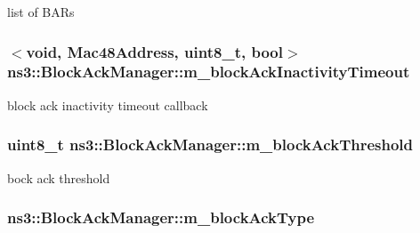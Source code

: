 list of B\+A\+Rs 

\subsubsection[{\texorpdfstring{m\+\_\+block\+Ack\+Inactivity\+Timeout}{m_blockAckInactivityTimeout}}]{$<$void, {\bf Mac48\+Address}, uint8\+\_\+t, bool$>$ ns3\+::\+Block\+Ack\+Manager\+::m\+\_\+block\+Ack\+Inactivity\+Timeout\hspace{0.3cm}{\ttfamily [private]}}\hypertarget{classns3_1_1BlockAckManager_aca48203aee618ed997d26c5e77a246a7}{}\label{classns3_1_1BlockAckManager_aca48203aee618ed997d26c5e77a246a7}


block ack inactivity timeout callback 

\subsubsection[{\texorpdfstring{m\+\_\+block\+Ack\+Threshold}{m_blockAckThreshold}}]{\setlength{\rightskip}{0pt plus 5cm}uint8\+\_\+t ns3\+::\+Block\+Ack\+Manager\+::m\+\_\+block\+Ack\+Threshold\hspace{0.3cm}{\ttfamily [private]}}\hypertarget{classns3_1_1BlockAckManager_a310943df91ddcf02959cd646a3b9cbce}{}\label{classns3_1_1BlockAckManager_a310943df91ddcf02959cd646a3b9cbce}


bock ack threshold 

\subsubsection[{\texorpdfstring{m\+\_\+block\+Ack\+Type}{m_blockAckType}}]{ ns3\+::\+Block\+Ack\+Manager\+::m\+\_\+block\+Ack\+Type\hspace{0.3cm}{\ttfamily [private]}}\hypertarget{classns3_1_1BlockAckManager_aa3a0c2d7132c556a98a6672de7665cb5}{}\label{classns3_1_1BlockAckManager_aa3a0c2d7132c556a98a6672de7665cb5}


